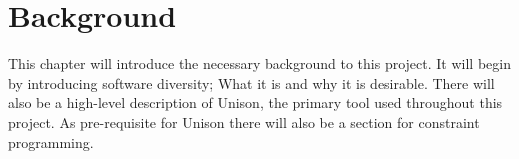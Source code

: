 \chapter{Background}

This chapter will introduce the necessary background to this project. It will begin by
introducing software diversity; What it is and why it is desirable. There will also be
a high-level description of Unison, the primary tool used throughout this project. As
pre-requisite for Unison there will also be a section for constraint programming.




